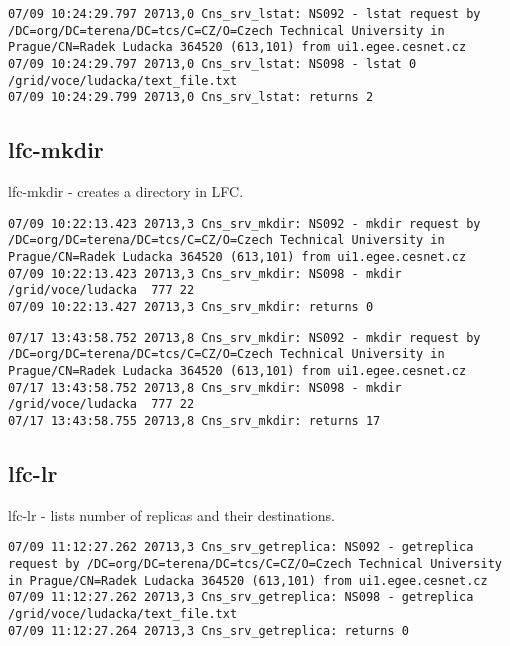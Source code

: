 \documentclass[a4paper, 11pt]{article} %
\begin{document}
\begin{lstlisting}[label={log:lcgcr2},caption={lcg-cr --vo voce -d srm://srm.grid.sara.nl:8443/pnfs/grid.sara.nl/data/voce/ludacka/text\_file.txt -l lfn:/grid/voce/ludacka/text\_file.txt "file://\$PWD/text\_file.txt" - query to file that does not exists}]
07/09 10:24:29.797 20713,0 Cns_srv_lstat: NS092 - lstat request by /DC=org/DC=terena/DC=tcs/C=CZ/O=Czech Technical University in Prague/CN=Radek Ludacka 364520 (613,101) from ui1.egee.cesnet.cz
07/09 10:24:29.797 20713,0 Cns_srv_lstat: NS098 - lstat 0 /grid/voce/ludacka/text_file.txt
07/09 10:24:29.799 20713,0 Cns_srv_lstat: returns 2
\end{lstlisting}

\subsection{lfc-mkdir}

lfc-mkdir - creates a directory in LFC.

\begin{lstlisting}[label={log:lfcmkdir1},caption={lfc-mkdir /grid/voce/ludacka}]
07/09 10:22:13.423 20713,3 Cns_srv_mkdir: NS092 - mkdir request by /DC=org/DC=terena/DC=tcs/C=CZ/O=Czech Technical University in Prague/CN=Radek Ludacka 364520 (613,101) from ui1.egee.cesnet.cz
07/09 10:22:13.423 20713,3 Cns_srv_mkdir: NS098 - mkdir /grid/voce/ludacka  777 22
07/09 10:22:13.427 20713,3 Cns_srv_mkdir: returns 0
\end{lstlisting}

\begin{lstlisting}[label={log:lfcmkdir2},caption={lfc-mkdir /grid/voce/ludacka directory already exists}]
07/17 13:43:58.752 20713,8 Cns_srv_mkdir: NS092 - mkdir request by /DC=org/DC=terena/DC=tcs/C=CZ/O=Czech Technical University in Prague/CN=Radek Ludacka 364520 (613,101) from ui1.egee.cesnet.cz
07/17 13:43:58.752 20713,8 Cns_srv_mkdir: NS098 - mkdir /grid/voce/ludacka  777 22
07/17 13:43:58.755 20713,8 Cns_srv_mkdir: returns 17
\end{lstlisting}

\subsection{lfc-lr}

lfc-lr - lists number of replicas and their destinations.

\begin{lstlisting}[label={log:lr1},caption={lcg-lr lfn://grid/voce/ludacka/text\_file.txt}]
07/09 11:12:27.262 20713,3 Cns_srv_getreplica: NS092 - getreplica request by /DC=org/DC=terena/DC=tcs/C=CZ/O=Czech Technical University in Prague/CN=Radek Ludacka 364520 (613,101) from ui1.egee.cesnet.cz
07/09 11:12:27.262 20713,3 Cns_srv_getreplica: NS098 - getreplica /grid/voce/ludacka/text_file.txt 
07/09 11:12:27.264 20713,3 Cns_srv_getreplica: returns 0
\end{lstlisting}
\end{document}
